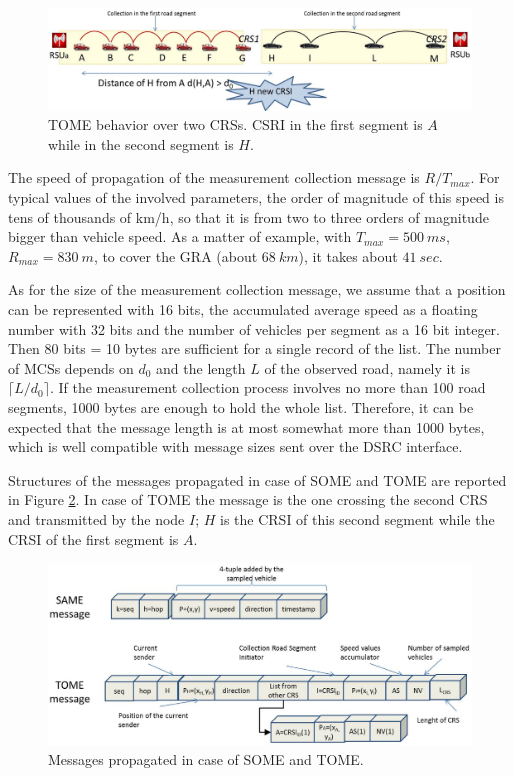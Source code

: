 \documentclass[conference]{IEEEtran}
\begin{document}
\begin{figure}[tbhp]
\begin{center}
\includegraphics[width=1.8\columnwidth]{fig/TOME_HOP.eps}
\caption{TOME behavior over two CRSs. CSRI in the first segment is $A$ while in the second segment is $H$.}
\label{fig:tome_hop}
\end{center}
\end{figure}


The speed of propagation of the measurement collection message is $R/T_{max}$. For typical values of the involved parameters, the order of magnitude of this speed is tens of thousands of km/h, so that it is from two to three orders of magnitude bigger than vehicle speed. As a matter of example, with $T_{max}=500~ms$, $R_{max}=830~m$, to cover the GRA (about $68~km$), it takes about $41~sec$.

As for the size of the measurement collection message, we assume that a position can be represented with 16 bits, the accumulated average speed as a floating number with 32 bits and the number of vehicles per segment as a 16 bit integer. Then 80 bits = 10 bytes are sufficient for a single record of the list. The number of MCSs depends on $d_0$ and the length $L$ of the observed road, namely it is $\lceil L/d_0 \rceil$. If the measurement collection process involves no more than 100 road segments, 1000 bytes are enough to hold the whole list. Therefore, it can be expected that the message length is at most somewhat more than 1000 bytes, which is well compatible with message sizes sent over the DSRC interface.

Structures of the messages propagated in case of SOME and TOME are reported in Figure \ref{fig:mess}. In case of TOME the message is the one crossing the second CRS and transmitted by the node $I$; $H$ is the CRSI of this second segment while the CRSI of the first segment is $A$.


\begin{figure}[tbhp]
\begin{center}
\includegraphics[width=1.8\columnwidth]{fig/message.eps}
\caption{Messages propagated in case of SOME and TOME.}
\label{fig:mess}
\end{center}
\end{figure}
\end{document}

